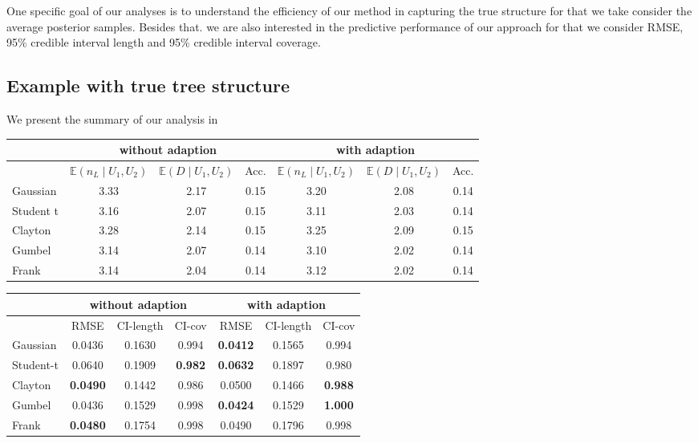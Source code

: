 \documentclass{amsart}
\begin{document}
One specific goal of our analyses is to understand the efficiency of our method in capturing the true structure for that we take consider the average posterior samples. Besides that. we are also interested in the predictive performance of our approach for that we consider RMSE, 95\% credible interval length and 95\% credible interval coverage. 

\subsection{Example with true tree structure} 

We present the summary of our analysis in 

\begin{table}[ht]
	\centering
	\begin{tabular}{l|ccc|ccc}
		\toprule
		\multicolumn{1}{c|}{} &
		\multicolumn{3}{c|}{without adaption} &
		\multicolumn{3}{c}{with adaption} \\
		\midrule
		& $\mathbb{E}(n_L\mid U_1,U_2)$ & $\mathbb{E}(D\mid U_1,U_2)$ & Acc. & $\mathbb{E}(n_L\mid U_1,U_2)$ & $\mathbb{E}(D\mid U_1,U_2)$ & Acc. \\ 
		\midrule
		Gaussian & 3.33 & 2.17 & 0.15 & 3.20 & 2.08 & 0.14 \\ 
		Student t & 3.16 & 2.07 & 0.15 & 3.11 & 2.03 & 0.14 \\ 
		Clayton & 3.28 & 2.14 & 0.15 & 3.25 & 2.09 & 0.15 \\ 
		Gumbel & 3.14 & 2.07 & 0.14 & 3.10 & 2.02 & 0.14 \\ 
		Frank & 3.14 & 2.04 & 0.14 & 3.12 & 2.02 & 0.14 \\ 
		\hline
	\end{tabular}
\end{table}

\begin{table}[ht]
	\centering
	\begin{tabular}{l|ccc|ccc}
		\toprule
		\multicolumn{1}{c|}{} &
		\multicolumn{3}{c|}{without adaption} &
		\multicolumn{3}{c}{with adaption} \\
		\midrule
		& RMSE & CI-length & CI-cov & RMSE & CI-length & CI-cov \\ 
		\midrule
		Gaussian & 0.0436 & 0.1630 & 0.994 & \textbf{0.0412} & 0.1565 & 0.994 \\ 
		Student-t & 0.0640 & 0.1909 & \textbf{0.982} & \textbf{0.0632} & 0.1897 & 0.980 \\ 
		Clayton & \textbf{0.0490} & 0.1442 & 0.986 & 0.0500 & 0.1466 & \textbf{0.988} \\ 
		Gumbel & 0.0436 & 0.1529 & 0.998 & \textbf{0.0424} & 0.1529 & \textbf{1.000} \\ 
		Frank & \textbf{0.0480} & 0.1754 & 0.998 & 0.0490 & 0.1796 & 0.998 \\ 
		\hline
	\end{tabular}
\end{table}
\end{document}
